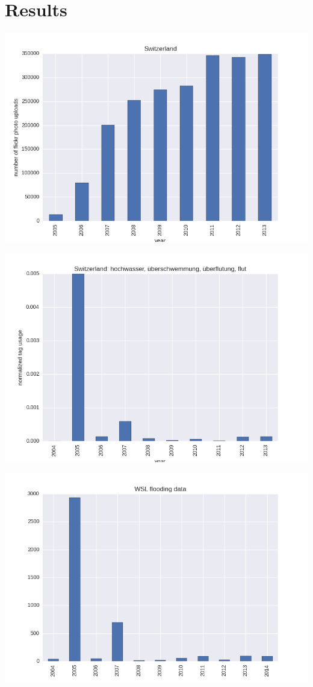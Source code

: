 \documentclass[letterpaper,10pt,english]{sphinxmanual}
\begin{document}
\chapter{Results}
\label{results::doc}\label{results:results}
\includegraphics{flickr_switzerland.png}

\includegraphics{flickr_flooding_switzerland.png}

\includegraphics{wsl.png}
\end{document}
